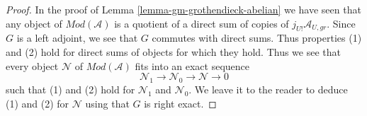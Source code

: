 \documentclass[10pt,a4paper]{amsart}
\theoremstyle{plain}
\theoremstyle{definition}
\theoremstyle{remark}
\numberwithin{equation}{subsection}
\begin{document}
\begin{proof}
\medskip\noindent
In the proof of Lemma \ref{lemma-gm-grothendieck-abelian}
we have seen that any object
of $\textit{Mod}(\mathcal{A})$ is a quotient of a direct sum
of copies of $j_{U!}\mathcal{A}_{U, gr}$. Since $G$ is a left
adjoint, we see that $G$ commutes with direct sums. Thus
properties (1) and (2) hold for direct sums of objects
for which they hold. Thus we see that every object $\mathcal{N}$
of $\textit{Mod}(\mathcal{A})$ fits into an exact sequence
$$
\mathcal{N}_1 \to \mathcal{N}_0 \to \mathcal{N} \to 0
$$
such that (1) and (2) hold for $\mathcal{N}_1$ and $\mathcal{N}_0$.
We leave it to the reader to deduce (1) and (2) for
$\mathcal{N}$ using that $G$ is right exact.
\end{proof}
\end{document}
